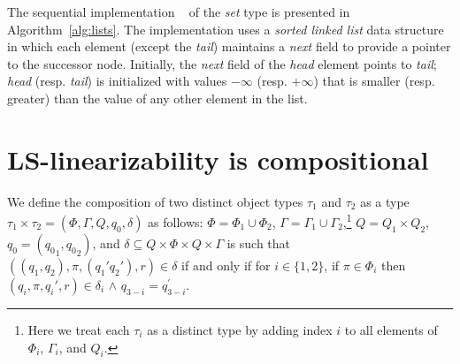 \documentclass[11pt,pdftex,letterpaper]{article}
\newcommand{\LS}{LS}
\newcommand{\LL}{\ms{LL}}
\begin{document}
 The sequential implementation \LL~ of the \emph{set} type is
presented in Algorithm~\ref{alg:lists}. The implementation uses a \emph{sorted linked list} data structure 
in which each element (except the \emph{tail}) maintains a \textit{next} field to provide a pointer to the
successor node. Initially, the \emph{next} field of the \emph{head} element points to \emph{tail}; \emph{head}
(resp. \emph{tail}) is initialized with values $-\infty$ (resp. $+\infty$) that is smaller (resp. greater) than
the value of any other element in the list.


\section{\LS-linearizability is compositional}
\label{app:comp}
We define the composition of two distinct object types $\tau_1$ and $\tau_2$ 
as a type $\tau_1\times\tau_2=(\Phi,\Gamma,Q,q_0,\delta)$ as follows: 
$\Phi=\Phi_1\cup \Phi_2$, $\Gamma=\Gamma_1\cup 
\Gamma_2$,\footnote{Here we treat each $\tau_i$ as a distinct type by adding
index $i$ to all elements of $\Phi_i$, $\Gamma_i$, and $Q_i$.}   
$Q=Q_1\times Q_2$,
$q_0=({q_0}_1,{q_0}_2)$, and  $\delta \subseteq Q\times \Phi \times Q\times
\Gamma$ is such that $((q_1,q_2),\pi,(q_1'q_2'),r)\in\delta$ if and only if for $i\in \{1,2\}$, if 
$\pi\in \Phi_i$ then $(q_i,\pi,q_i',r)\in\delta_i$ $\wedge$ $q_{3-i}=q^{\prime}_{3-i}$.
\end{document}

